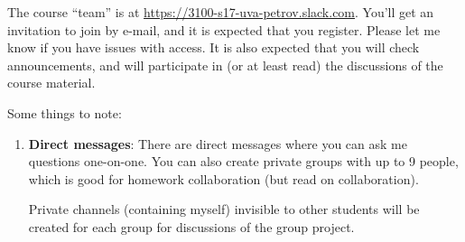 \documentclass[oneside,11pt]{amsart}
\begin{document}
The course ``team'' is at \url{https://3100-s17-uva-petrov.slack.com}. You'll get
an invitation to join by e-mail, and it is expected that you register.
Please
let me know if you have issues with access. 
It is also expected that you
will check announcements, and will participate in (or at least read)
the discussions of the course material.

Some things to note: 
\begin{enumerate}[$\bullet$] 
	\item \textbf{Direct messages}:
		There are direct messages where you can ask me questions
		one-on-one. You can also create private groups with up to 9 people, which
		is good for homework collaboration (but read  on
		collaboration).

		\noindent Private channels (containing myself) invisible to other students
		will be created for each group for discussions of the group project.


\end{enumerate}
\end{document}

